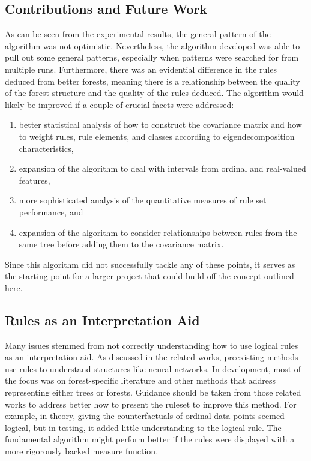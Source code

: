 \documentclass[11pt]{article}
\begin{document}
\subsection{Contributions and Future Work}
As can be seen from the experimental results, the general pattern of the algorithm was not optimistic. Nevertheless, the algorithm developed was able to pull out some general patterns, especially when patterns were searched for from multiple runs. Furthermore, there was an evidential difference in the rules deduced from better forests, meaning there is a relationship between the quality of the forest structure and the quality of the rules deduced. The algorithm would likely be improved if a couple of crucial facets were addressed:
\begin{enumerate}
\item better statistical analysis of how to construct the covariance matrix and how to weight rules, rule elements, and classes according to eigendecomposition characteristics, 
\item expansion of the algorithm to deal with intervals from ordinal and real-valued features,
\item more sophisticated analysis of the quantitative measures of rule set performance, and
\item expansion of the algorithm to consider relationships between rules from the same tree before adding them to the covariance matrix. 
\end{enumerate}
Since this algorithm did not successfully tackle any of these points, it serves as the starting point for a larger project that could build off the concept outlined here. 

\subsection{Rules as an Interpretation Aid}
Many issues stemmed from not correctly understanding how to use logical rules as an interpretation aid. As discussed in the related works, preexisting methods use rules to understand structures like neural networks. In development, most of the focus was on forest-specific literature and other methods that address representing either trees or forests. Guidance should be taken from those related works to address better how to present the ruleset to improve this method. For example, in theory, giving the counterfactuals of ordinal data points seemed logical, but in testing, it added little understanding to the logical rule. The fundamental algorithm might perform better if the rules were displayed with a more rigorously backed measure function. 
\end{document}
